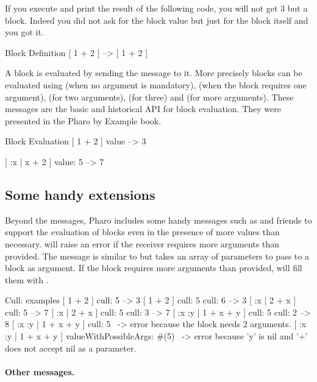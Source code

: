 \documentclass[a4paper,10pt,twoside]{book}
\begin{document}
If you execute and print the result of the following code, you will not get 3 but a block. Indeed you did not ask for the block value but just for the block itself and you got it.

\begin{code}{Block Definition}
[ 1 + 2 ] --> [ 1 + 2 ]
\end{code}

 A block is evaluated by sending the  message to it. More precisely blocks can be evaluated using  (when no argument is mandatory),  (when the block requires one argument),  (for two arguments),  (for three) and  (for more arguments). These messages are the basic and historical API for block evaluation. They were presented in the Pharo by Example book.

\begin{code}{Block Evaluation}
[ 1 + 2 ] value --> 3

[ :x | x + 2 ] value: 5 --> 7
\end{code}

\subsection{Some handy extensions}

Beyond the  messages, Pharo includes some handy messages
such as  and friends to support the evaluation of blocks even
in the presence of more values than necessary.  will raise
an error if the receiver requires more arguments than provided. The
 message is similar to  but takes
an array of parameters to pass to a block as argument. If the block
requires more arguments than provided, 
will fill them with .

\begin{code}{Cull: examples}
[ 1 + 2 ] cull: 5 --> 3
[ 1 + 2 ] cull: 5 cull: 6 --> 3
[ :x | 2 + x ] cull: 5 --> 7
[ :x | 2 + x ] cull: 5 cull: 3 --> 7
[ :x :y | 1 + x + y ] cull: 5 cull: 2 --> 8
[ :x :y | 1 + x + y ] cull: 5 ~-> error because the block needs 2 arguments.
[ :x :y | 1 + x + y ] valueWithPossibleArgs: #(5)
                      ~-> error because 'y' is nil and '+' does not accept nil as a parameter.
\end{code}


\paragraph{Other messages.}
\end{document}
